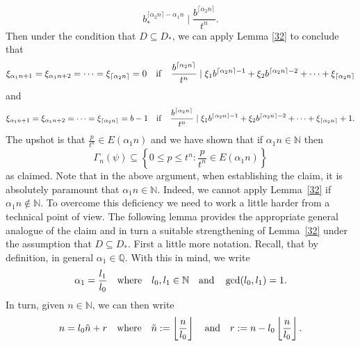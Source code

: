 \documentclass[12pt]{article}
\theoremstyle{definition}
\theoremstyle{remark}
\newcommand{\red}[1]{\textcolor[rgb]{1.00,0.00,0.00}{#1}}
\newcommand{\sv}[1]{{\color{blue}   {#1}}}
\begin{document}
\begin{equation}\label{divisible 6}  
b_{*}^{\lceil\alpha_{2}n\rceil-\alpha_{1}n}\mid\frac{b^{\lceil\alpha_{2}n\rceil}}{t^{n}}.
\end{equation}
Then under the condition that $D\subseteq D_{*}$, we can apply Lemma \ref{32} to conclude that
$$\xi_{\alpha_{1}n+1}=\xi_{\alpha_{1}n+2}=\cdots=\xi_{\lceil\alpha_{2}n\rceil}=0\quad {\rm if}\quad \frac{b^{\lceil\alpha_{2}n\rceil}}{t^{n}}\mid  \xi_{1}b^{\lceil\alpha_{2}n\rceil-1}+\xi_{2}b^{\lceil\alpha_{2}n\rceil-2}+\cdots+\xi_{\lceil\alpha_{2}n\rceil}$$
and  
$$\xi_{\alpha_{1}n+1}=\xi_{\alpha_{1}n+2}=\cdots=\xi_{\lceil\alpha_{2}n\rceil}=b-1\quad {\rm if}\quad \frac{b^{\lceil\alpha_{2}n\rceil}}{t^{n}}\mid \xi_{1}b^{\lceil\alpha_{2}n\rceil-1}+\xi_{2}b^{\lceil\alpha_{2}n\rceil-2}+\cdots+\xi_{\lceil\alpha_{2}n\rceil}+1.$$
The upshot is  that $\frac{p}{t^n}  \in E(\alpha_1 n)$  and we have shown that if $\alpha_{1}n\in\mathbb{N}$ then 
\begin{equation}  \label{svstrongform} \Gamma_{n}(\psi)\subseteq\left\{0\leq p\leq t^{n}:\textstyle{\frac{p}{t^{n}}}\in E (\alpha_{1}n)\right\}  \end{equation}
as claimed.   Note that in the  above argument, when   establishing the claim, 
it is absolutely paramount that   $\alpha_{1}n\in\mathbb{N}$. Indeed, we cannot  apply   Lemma~\ref{32}    if   $\alpha_{1}n\notin\mathbb{N}$. To overcome this deficiency 
we need to work a little  harder  from a technical point of view.  The following lemma  provides the appropriate general analogue of the claim and in turn a suitable strengthening of Lemma~\ref{32} under the assumption that  $ D\subseteq D_{*}$.  First a little more notation.   Recall, that by definition, in general $\alpha_{1}\in\mathbb{Q}$.  With this in mind, we write  
\begin{equation}\label{equality 4}
\alpha_{1}=\frac{l_{1}}{l_{0}}  \quad  {\rm where}\quad  l_{0},l_{1}\in\mathbb{N}\quad  {\rm and}\quad  \gcd(l_{0},l_{1})=1.  
\end{equation}
In turn, given  $ n \in  \mathbb{N}$, we  can then write 
\begin{equation}\label{equality 5} 
n=l_{0}\tilde{n}+r \quad {\rm where}\quad \tilde{n}:=\left\lfloor\frac{n}{l_{0}}\right\rfloor\quad {\rm and}\quad r:=n-l_{0}\left\lfloor\frac{n}{l_{0}}\right\rfloor.
\end{equation}

\medskip 
\end{document}

